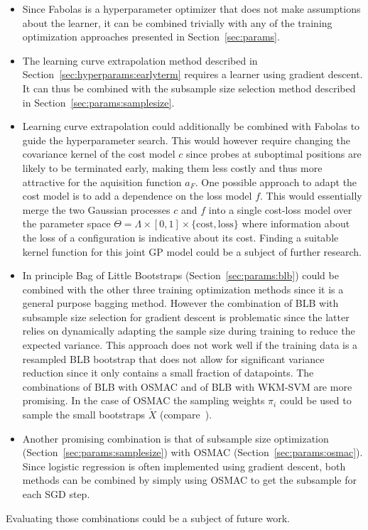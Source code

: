 \begin{itemize}
	\item Since Fabolas is a hyperparameter optimizer that does not make assumptions about the learner, it can be combined trivially with any of the training optimization approaches presented in Section~\ref{sec:params}.
	\item The learning curve extrapolation method described in Section~\ref{sec:hyperparams:earlyterm} requires a learner using gradient descent.
		It can thus be combined with the subsample size selection method described in Section~\ref{sec:params:samplesize}.
	\item Learning curve extrapolation could additionally be combined with Fabolas to guide the hyperparameter search.
		This would however require changing the covariance kernel of the cost model \(c\) since probes at suboptimal positions are likely to be terminated early, making them less costly and thus more attractive for the aquisition function \(a_F\).
		One possible approach to adapt the cost model is to add a dependence on the loss model \(f\).
		This would essentially merge the two Gaussian processes \(c\) and \(f\) into a single cost-loss model over the parameter space \(\Theta = \Lambda \times [0, 1] \times \{\mathrm{cost}, \mathrm{loss}\}\) where information about the loss of a configuration is indicative about its cost.
		Finding a suitable kernel function for this joint GP model could be a subject of further research.
	\item In principle Bag of Little Bootstraps (Section~\ref{sec:params:blb}) could be combined with the other three training optimization methods since it is a general purpose bagging method.
		However the combination of BLB with subsample size selection for gradient descent is problematic since the latter relies on dynamically adapting the sample size during training to reduce the expected variance.
		This approach does not work well if the training data is a resampled BLB bootstrap that does not allow for significant variance reduction since it only contains a small fraction of datapoints.
		The combinations of BLB with OSMAC and of BLB with WKM-SVM are more promising.
		In the case of OSMAC the sampling weights \(\pi_i\) could be used to sample the small bootstraps \(\check{X}\) (compare~\citet{Norazan2009}).
	\item Another promising combination is that of subsample size optimization (Section~\ref{sec:params:samplesize}) with OSMAC (Section~\ref{sec:params:osmac}).
		Since logistic regression is often implemented using gradient descent, both methods can be combined by simply using OSMAC to get the subsample for each SGD step.
\end{itemize}
Evaluating those combinations could be a subject of future work.
